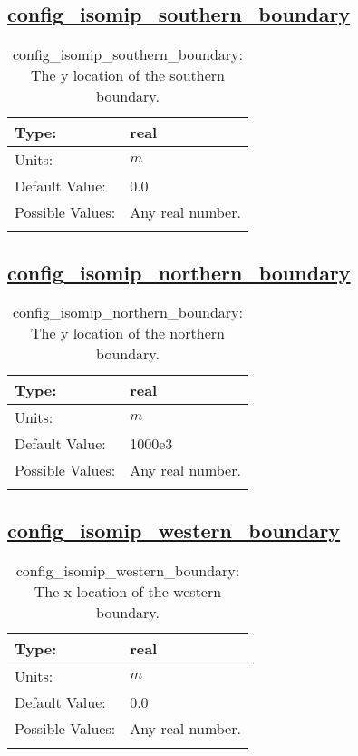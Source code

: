 \subsection[config\_isomip\_southern\_boundary]{\hyperref[sec:nm_tab_isomip]{config\_isomip\_southern\_boundary}}
\label{subsec:nm_sec_config_isomip_southern_boundary}
\begin{center}
\begin{longtable}{| p{2.0in} || p{4.0in} |}
    \hline
    Type: & real \\
    \hline
    Units: & $m$ \\
    \hline
    Default Value: & 0.0 \\
    \hline
    Possible Values: & Any real number. \\
    \hline
    \caption{config\_isomip\_southern\_boundary: The y location of the southern boundary.}
\end{longtable}
\end{center}
\subsection[config\_isomip\_northern\_boundary]{\hyperref[sec:nm_tab_isomip]{config\_isomip\_northern\_boundary}}
\label{subsec:nm_sec_config_isomip_northern_boundary}
\begin{center}
\begin{longtable}{| p{2.0in} || p{4.0in} |}
    \hline
    Type: & real \\
    \hline
    Units: & $m$ \\
    \hline
    Default Value: & 1000e3 \\
    \hline
    Possible Values: & Any real number. \\
    \hline
    \caption{config\_isomip\_northern\_boundary: The y location of the northern boundary.}
\end{longtable}
\end{center}
\subsection[config\_isomip\_western\_boundary]{\hyperref[sec:nm_tab_isomip]{config\_isomip\_western\_boundary}}
\label{subsec:nm_sec_config_isomip_western_boundary}
\begin{center}
\begin{longtable}{| p{2.0in} || p{4.0in} |}
    \hline
    Type: & real \\
    \hline
    Units: & $m$ \\
    \hline
    Default Value: & 0.0 \\
    \hline
    Possible Values: & Any real number. \\
    \hline
    \caption{config\_isomip\_western\_boundary: The x location of the western boundary.}
\end{longtable}
\end{center}
